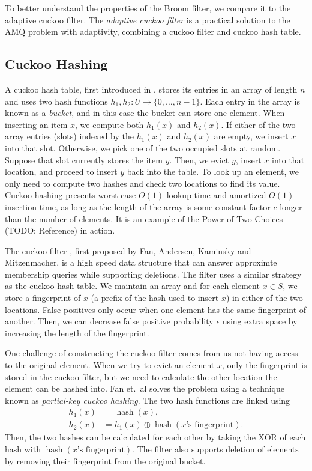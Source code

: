 \documentclass[../paper.tex]{subfiles}
\begin{document}
\newcommand{\on}{\operatorname}
To better understand the properties of the Broom filter, we compare it to the adaptive cuckoo filter.
The \emph{adaptive cuckoo filter} \cite{adaptive-cuckoo} is a practical solution to the AMQ problem with adaptivity, combining a cuckoo filter and cuckoo hash table.

\subsection{Cuckoo Hashing}
A cuckoo hash table, first introduced in \cite{cuckoo-hash}, stores its entries in an array of length $n$ and uses two hash functions $h_1,h_2:U\to \{0,\ldots,n-1\}$.
Each entry in the array is known as a \emph{bucket}, and in this case the bucket can store one element. When inserting an item $x$, we compute both $h_1(x)$ and $h_2(x)$. If either of the two array entries (slots) indexed by the $h_1(x)$ and $h_2(x)$ are empty, we insert $x$ into that slot.
Otherwise, we pick one of the two occupied slots at random. Suppose that slot currently stores the item $y$. Then, we evict $y$, insert $x$ into that location,
and proceed to insert $y$ back into the table. To look up an element, we only need to compute two hashes and check two locations to find its value.
Cuckoo hashing presents worst case $O(1)$ lookup time and amortized $O(1)$ insertion time, as long as the length of the array is some constant factor $c$ longer
than the number of elements. It is an example of the Power of Two Choices (TODO: Reference) in action.

The cuckoo filter \cite{cuckoo-filter}, first proposed by Fan, Andersen, Kaminsky and Mitzenmacher, is a high speed data structure that can answer approximte membership queries while supporting deletions.
The filter uses a similar strategy as the cuckoo hash table. We maintain an array and for each element $x\in S$, we store a fingerprint of $x$ (a prefix of the hash used to insert $x$) in either of the two locations. False positives only occur when one element has the same fingerprint of another. Then, we can decrease false positive probability $\epsilon$ using extra space by increasing the length of the fingerprint.

One challenge of constructing the cuckoo filter comes from us not having access to the original element. When we try to evict an element $x$, only the fingerprint
is stored in the cuckoo filter, but we need to calculate the other location the element can be hashed into. Fan et.\ al solves the problem using a technique known as \emph{partial-key cuckoo hashing}.
The two hash functions are linked using \begin{align*}
    h_1(x)&=\on{hash}(x), \\ h_2(x)&=h_1(x)\oplus \on{hash}(x\text{'s fingerprint}).
\end{align*} Then, the two hashes can be calculated for each other by taking the XOR of each hash with $\on{hash}(x\text{'s fingerprint})$. The filter also supports deletion of elements by removing their fingerprint from the original bucket.
\end{document}
